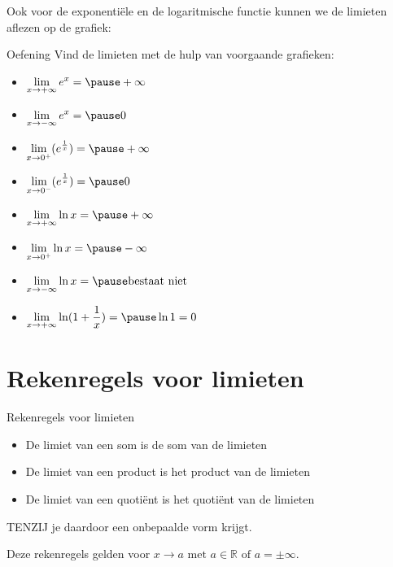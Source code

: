 \documentclass[handout]{beamer}
\newcommand{\ds}{\displaystyle}
\begin{document}
\begin{frame}
Ook voor de exponenti\"{e}le en de logaritmische functie kunnen we de
limieten aflezen op de grafiek:
\begin{center}
\end{center}
\end{frame}

\begin{frame}{Oefening}
Vind de limieten met de hulp van voorgaande grafieken:
\begin{itemize}

\item $\ds \lim_{x \rightarrow + \infty} e^x = \pause + \infty$
\item $\ds \lim_{x \rightarrow - \infty} e^x = \pause 0$

\item $\displaystyle{\lim_{x \to  0^+}} (e^{\frac 1x}) = \pause +\infty$
\item $\displaystyle{\lim_{x  \to  0^-}} (e^{\frac 1x}) = \pause 0$
\item $\ds \lim_{x \rightarrow + \infty} \ln x = \pause +\infty$
\item $\displaystyle{\lim_{x \to  0^+}} \ln x = \pause -\infty$
\item $\ds \lim_{x \rightarrow - \infty} \ln x = \pause \mbox{bestaat niet}$
\item $\ds \lim_{x \rightarrow + \infty} \ln(1+ \frac 1x) = \pause \ln 1 = 0$
\end{itemize}

\end{frame}



\section{Rekenregels voor limieten }
\begin{frame}{Rekenregels voor limieten}


\begin{itemize}
	\item De limiet
van een som is de som van de limieten
\item De limiet van een product is
het product van de limieten
\item De limiet van een quoti\"ent is het
quoti\"ent van de limieten
\end{itemize}
TENZIJ je daardoor een onbepaalde vorm
krijgt.

Deze rekenregels gelden voor $x \rightarrow a \text{ met } {a \in
\mathbb{R} \text{ of } a = \pm \infty}$.
\end{frame}
\end{document}
